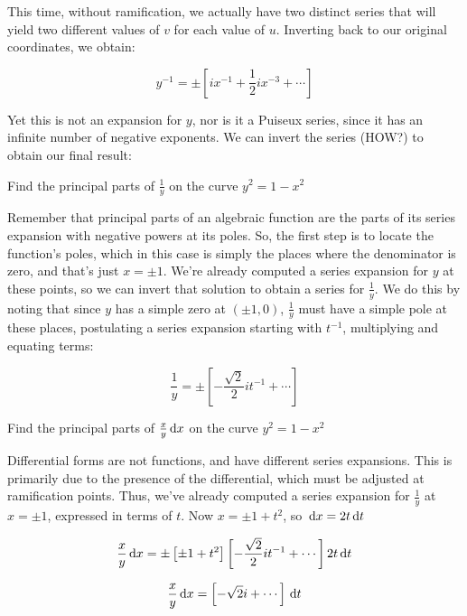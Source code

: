 This time, without ramification, we actually have two distinct series
that will yield two different values of $v$ for each value of $u$.
Inverting back to our original coordinates, we obtain:

$$y^{-1} = \pm \left[ i x^{-1} + \frac{1}{2} i x^{-3} + \cdots \right]$$

Yet this is not an expansion for $y$, nor is it a Puiseux series,
since it has an infinite number of negative exponents.  We can invert
the series (HOW?) to obtain our final result:

\endexample

\example Find the principal parts of $\frac{1}{y}$ on the curve
$y^2 = 1 - x^2$

Remember that principal parts of an algebraic function are the parts
of its series expansion with negative powers at its poles.  So, the
first step is to locate the function's poles, which in this case is
simply the places where the denominator is zero, and that's just
$x=\pm 1$.  We're already computed a series expansion for $y$ at these
points, so we can invert that solution to obtain a series for
$\frac{1}{y}$.  We do this by noting that since $y$ has a simple zero
at $(\pm 1, 0)$, $\frac{1}{y}$ must have a simple pole at these places,
postulating a series expansion starting with $t^{-1}$, multiplying
and equating terms:

$$\frac{1}{y} = \pm\left[ -\frac{\sqrt{2}}{2} it^{-1} + \cdots \right]$$

\endexample

%
%
%

\example Find the principal parts of $\frac{x}{y} \,\mathrm{d} x$ on the curve
$y^2 = 1 - x^2$

Differential forms are not functions, and have different series
expansions.  This is primarily due to the presence of the
differential, which must be adjusted at ramification points.  Thus,
we've already computed a series expansion for $\frac{1}{y}$ at $x=\pm
1$, expressed in terms of $t$.  Now $x=\pm 1 + t^2$, so $\,\mathrm{d} x=2t\,\mathrm{d}
t$

$$\frac{x}{y} \,\mathrm{d} x = \pm \left[\pm 1 + t^2 \right] \left[ -\frac{\sqrt{2}}{2} it^{-1} + \cdots \right] 2t \,\mathrm{d} t$$

$$\frac{x}{y} \,\mathrm{d} x = \left[ -\sqrt{2} i + \cdots \right] \,\mathrm{d} t$$

